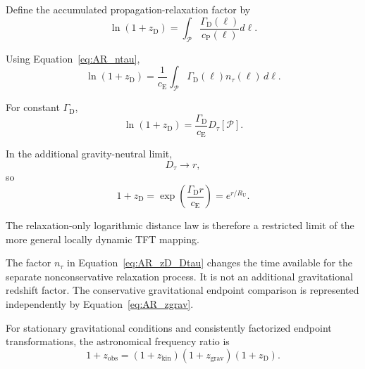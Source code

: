 Define the accumulated propagation-relaxation factor by
\begin{equation}
    \boxed{
    \ln(1+z_{\mathrm D})
    =
    \int_{\mathcal P}
    \frac{
        \Gamma_{\mathrm D}(\ell)
    }{
        c_{\mathrm P}(\ell)
    }
    d\ell.
    }
    \label{eq:AR_zD_cP}
\end{equation}

Using Equation~\eqref{eq:AR_ntau},
\begin{equation}
    \boxed{
    \ln(1+z_{\mathrm D})
    =
    \frac{1}{c_{\mathrm E}}
    \int_{\mathcal P}
    \Gamma_{\mathrm D}(\ell)
    n_\tau(\ell)\,d\ell.
    }
    \label{eq:AR_zD_Dtau}
\end{equation}

For constant \(\Gamma_{\mathrm D}\),
\begin{equation}
    \boxed{
    \ln(1+z_{\mathrm D})
    =
    \frac{
        \Gamma_{\mathrm D}
    }{
        c_{\mathrm E}
    }
    D_\tau[\mathcal P].
    }
    \label{eq:AR_zD_constant}
\end{equation}

In the additional gravity-neutral limit,
\begin{equation}
    D_\tau
    \rightarrow
    r,
\end{equation}
so
\begin{equation}
    1+z_{\mathrm D}
    =
    \exp
    \left(
        \frac{
            \Gamma_{\mathrm D}r
        }{
            c_{\mathrm E}
        }
    \right)
    =
    e^{r/R_{\mathrm U}}.
    \label{eq:AR_zD_flat}
\end{equation}

The relaxation-only logarithmic distance law is therefore a restricted limit
of the more general locally dynamic TFT mapping.

The factor \(n_\tau\) in Equation~\eqref{eq:AR_zD_Dtau} changes the time
available for the separate nonconservative relaxation process. It is not an
additional gravitational redshift factor. The conservative gravitational
endpoint comparison is represented independently by
Equation~\eqref{eq:AR_zgrav}.

For stationary gravitational conditions and consistently factorized endpoint
transformations, the astronomical frequency ratio is
\begin{equation}
    \boxed{
    1+z_{\mathrm{obs}}
    =
    (1+z_{\mathrm{kin}})
    (1+z_{\mathrm{grav}})
    (1+z_{\mathrm D}).
    }
    \label{eq:AR_total_redshift}
\end{equation}

